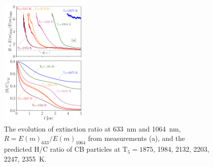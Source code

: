 \begin{figure}[!t]
	\centering
	\includegraphics[width=0.38\textwidth]{Figures/htoc_extratio.pdf}
	\caption{The evolution of extinction ratio at 633~nm and 1064~nm, $R=E(m)_{633}/E(m)_{1064}$ from measurements (a), and the predicted H/C ratio of CB particles at $\mathrm{T_5}=1875$, 1984, 2132, 2203, 2247, 2355~K.}
	\label{fig:htoc_extratio} 
\end{figure}